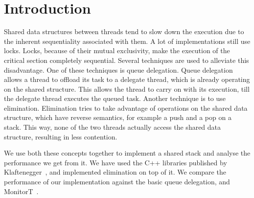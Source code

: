 \section{Introduction}
Shared data structures between threads tend to slow down the execution due to the inherent sequentiality associated with them. A lot of implementations still use locks. Locks, because of their mutual exclusivity, make the execution of the critical section completely sequential. Several techniques are used to alleviate this disadvantage. One of these techniques is queue delegation. Queue delegation allows a thread to offload its task to a delegate thread, which is already operating on the shared structure. This allows the thread to carry on with its execution, till the delegate thread executes the queued task. Another technique is to use elimination. Elimination tries to take advantage of operations on the shared data structure, which have reverse semantics, for example a push and a pop on a stack. This way, none of the two threads actually access the shared data structure, resulting in less contention. 

We use both these concepts together to implement a shared stack and analyse the performance we get from it. We have used the C++ libraries published by Klaftenegger~\cite{QDLibEuroPar-14}, and implemented elimination on top of it. We compare the performance of our implementation against the basic queue delegation, and MonitorT~\cite{hung2014activemonitor}.


